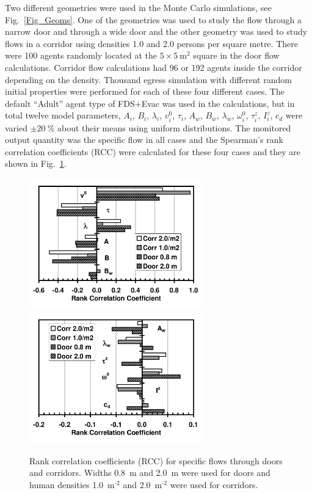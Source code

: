 \documentclass[12pt,a4paper,final,twoside]{stylevk}
\begin{document}
Two different geometries were used in the Monte Carlo simulations, see
Fig.~\ref{Fig_Geoms}. One of the geometries was used to study the
flow through a narrow door and through a wide door and the other
geometry was used to study flows in a corridor using densities 1.0 and
2.0 persons per square metre.  There were 100 agents randomly located
at the $5 \times 5 ~\mathrm{ \textrm{m}^\textrm{2} } $ square in the
door flow calculations.  Corridor flow calculations had 96 or 192
agents inside the corridor depending on the density.  Thousand egress
simulation with different random initial properties were performed for
each of these four different cases.  The default ``Adult'' agent type
of FDS+Evac was used in the calculations, but in total twelve model
parameters, $A_i$, $B_i$, $\lambda_i$, $v^0_i$, $\tau_i$, $A_w$,
$B_w$, $\lambda_w$, $\omega^0_i$, $\tau^z_i$, $I^z_{i}$, $c_d$ were
varied $\pm 20~\%$ about their means using uniform distributions.  The
monitored output quantity was the specific flow in all cases and the
Spearman's rank correlation coefficients (RCC) were calculated for
these four cases and they are shown in Fig.~\ref{Fig_RCC}.

%
\begin{figure}[!tb]
  \centerline{\includegraphics[clip=true,
      width=75mm]{FIGURES/Collect_RCC_Fds600Evac241_Main1}  
      \includegraphics[clip=true,
      width=75mm]{FIGURES/Collect_RCC_Fds600Evac241_Main2} } 
  \caption{Rank correlation coefficients (RCC) for specific flows
    through doors and corridors.  Widths 0.8~m and 2.0~m were used for
    doors and human densities 1.0~$\mathrm{ \textrm{m}^\textrm{-2} } $
    and 2.0~$\mathrm{ \textrm{m}^\textrm{-2} } $ were used for
    corridors.\protect\hspace{200mm}}\label{Fig_RCC}
\end{figure}
%
\end{document}
